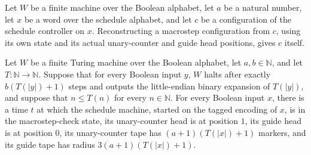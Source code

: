 \begin{lemma}
\label{Complexity.macroCfg_self}
\leanok
{}
Let $W$ be a finite machine over the Boolean alphabet, let $a$ be a natural number, let
$x$ be a word over the schedule alphabet, and let $c$ be a configuration of the schedule
controller on $x$. Reconstructing a macrostep configuration from $c$, using its own
state and its actual unary-counter and guide head positions, gives $c$ itself.
\end{lemma}

\begin{lemma}
\label{Complexity.obliviousSchedule_ready}
\leanok
{}
Let $W$ be a finite Turing machine over the Boolean alphabet, let $a,b\in\mathbb{N}$,
and let $T\colon\mathbb{N}\to\mathbb{N}$. Suppose that for every Boolean input $y$, $W$
halts after exactly $b(T(|y|)+1)$ steps and outputs the little-endian binary expansion
of $T(|y|)$, and suppose that $n\le T(n)$ for every $n\in\mathbb{N}$. For every Boolean
input $x$, there is a time $t$ at which the schedule machine, started on the tagged
encoding of $x$, is in the macrostep-check state, its unary-counter head is at position
$1$, its guide head is at position $0$, its unary-counter tape has $(a+1)(T(|x|)+1)$
markers, and its guide tape has radius $3(a+1)(T(|x|)+1)$.
\end{lemma}

